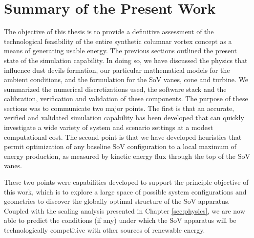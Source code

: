 \label{sec:conclusions}

%
%

%
%

\section{Summary of the Present Work}

%
%

%
%
%

The objective of this thesis is to provide a definitive assessment of
the technological feasibility of the entire synthetic columnar vortex
concept as a means of generating usable energy. The previous sections
outlined the present state of the simulation capability. In doing so, we
have discussed the physics that influence dust devils formation, our
particular mathematical models for the ambient conditions, and the
formulation for the SoV vanes, cone and turbine. We summarized the
numerical discretizations used, the software stack and the calibration,
verification and validation of these components. The purpose of these
sections was to communicate two major points. The first is that an
accurate, verified and validated simulation capability has been
developed that can quickly investigate a wide variety of system and
scenario settings at a modest computational cost. The second point is
that we have developed heuristics that permit optimization of any
baseline SoV configuration to a local maximum of energy production, as
measured by kinetic energy flux through the top of the SoV vanes.  

These two points were capabilities developed to support the principle
objective of this work, which is to explore a large space of possible
system configurations and geometries to discover the globally optimal
structure of the SoV apparatus. Coupled with the scaling analysis
presented in Chapter \ref{sec:physics}, we are now able to predict
the conditions (if any) under which the SoV apparatus will be
technologically competitive with other sources of renewable energy.  


